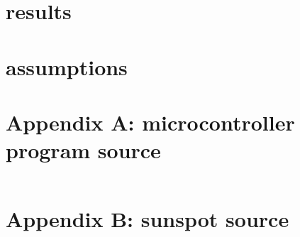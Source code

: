 \documentclass[a4paper, 12pt, titlepage]{article}
\begin{document}

\section{results} %

\section{assumptions} %


\newpage
\appendix

\section{Appendix A: microcontroller program source} %
\begin{verbatim}
\end{verbatim}

\section{Appendix B: sunspot source} %

\end{document}
